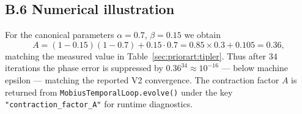 \documentclass[11pt,a4paper]{article}
\theoremstyle{definition}
\theoremstyle{remark}
\begin{document}
\subsection*{B.6 Numerical illustration}
For the canonical parameters $\alpha = 0.7$, $\beta = 0.15$ we obtain
\begin{equation}
  A = (1 - 0.15)(1 - 0.7) + 0.15 \cdot 0.7
    = 0.85 \times 0.3 + 0.105 = 0.36,
\end{equation}
matching the measured value in
Table~\ref{sec:priorart:tipler}. Thus after $34$ iterations the phase
error is suppressed by $0.36^{34} \approx 10^{-16}$ --- below machine
epsilon --- matching the reported V2 convergence. The contraction
factor $A$ is returned from \texttt{MobiusTemporalLoop.evolve()} under
the key \texttt{"contraction\_factor\_A"} for runtime diagnostics.
\end{document}
